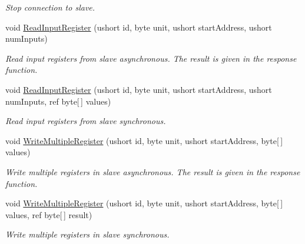\begin{DoxyCompactItemize}
\begin{DoxyCompactList}\small\item\em Stop connection to slave.\end{DoxyCompactList}\item 
void \hyperlink{class_robo_library_1_1_mod_bus_ac6c8875d17a35857e67b03d323242477}{Read\+Input\+Register} (ushort id, byte unit, ushort start\+Address, ushort num\+Inputs)
\begin{DoxyCompactList}\small\item\em Read input registers from slave asynchronous. The result is given in the response function.\end{DoxyCompactList}\item 
void \hyperlink{class_robo_library_1_1_mod_bus_ad29bd993efa327748d9929067370bc1a}{Read\+Input\+Register} (ushort id, byte unit, ushort start\+Address, ushort num\+Inputs, ref byte\mbox{[}$\,$\mbox{]} values)
\begin{DoxyCompactList}\small\item\em Read input registers from slave synchronous.\end{DoxyCompactList}\item 
void \hyperlink{class_robo_library_1_1_mod_bus_a0634f07f2e7a02d5a44463eb5f6e7e39}{Write\+Multiple\+Register} (ushort id, byte unit, ushort start\+Address, byte\mbox{[}$\,$\mbox{]} values)
\begin{DoxyCompactList}\small\item\em Write multiple registers in slave asynchronous. The result is given in the response function.\end{DoxyCompactList}\item 
void \hyperlink{class_robo_library_1_1_mod_bus_a205c787f13c0068e875197112552f3a6}{Write\+Multiple\+Register} (ushort id, byte unit, ushort start\+Address, byte\mbox{[}$\,$\mbox{]} values, ref byte\mbox{[}$\,$\mbox{]} result)
\begin{DoxyCompactList}\small\item\em Write multiple registers in slave synchronous.\end{DoxyCompactList}\end{DoxyCompactItemize}
